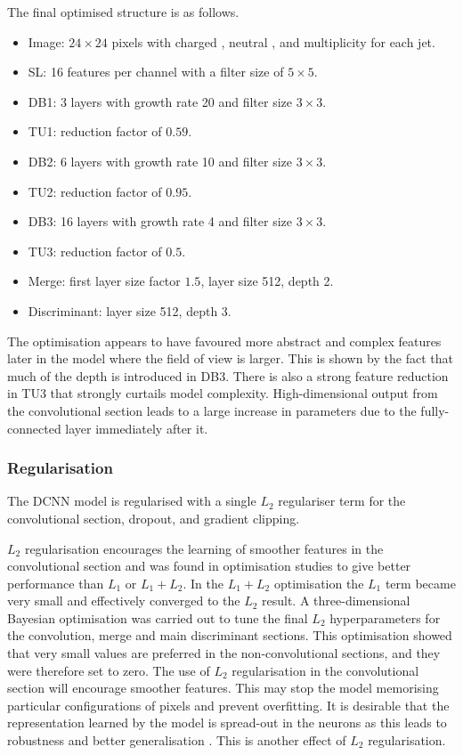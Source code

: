 The final optimised structure is as follows.
\begin{itemize}[noitemsep]
    \item Image: $24\times{24}$ pixels with charged \pt, neutral \pt, and multiplicity for each jet.
    \item SL: 16 features per channel with a filter size of $5\times{}5$.
    \item DB1: 3 layers with growth rate 20 and filter size $3\times{}3$.
    \item TU1: reduction factor of $0.59$.
    \item DB2: 6 layers with growth rate 10 and filter size $3\times{}3$.
    \item TU2: reduction factor of $0.95$.
    \item DB3: 16 layers with growth rate 4 and filter size $3\times{}3$.
    \item TU3: reduction factor of $0.5$.
    \item Merge: first layer size factor $1.5$, layer size 512, depth 2.
    \item Discriminant: layer size 512, depth 3.
\end{itemize}
The optimisation appears to have favoured more abstract and complex features later in the model where the field of view is larger. This is shown by the fact that much of the depth is introduced in DB3. 
There is also a strong feature reduction in TU3 that strongly curtails model complexity. High-dimensional output from the convolutional section leads to a large increase in parameters due to the fully-connected layer immediately after it. 




\subsubsection{Regularisation}
The DCNN model is regularised with a single $L_2$ regulariser term for the convolutional section, dropout, and gradient clipping.

$L_2$ regularisation encourages the learning of smoother features in the convolutional section and was found in optimisation studies to give better performance than $L_1$ or $L_1 + L_2$. 
In the $L_1 + L_2$ optimisation the $L_1$ term became very small and effectively converged to the $L_2$ result.
A three-dimensional Bayesian optimisation was carried out to tune the final $L_2$ hyperparameters for the convolution, merge and main discriminant sections.
This optimisation showed that very small values are preferred in the non-convolutional sections, and they were therefore set to zero. 
The use of $L_2$ regularisation in the convolutional section will encourage smoother features. This may stop the model memorising particular configurations of pixels and prevent overfitting. 
It is desirable that the representation learned by the model is spread-out in the neurons as this leads to robustness and better generalisation \cite{DeepMindDeletion}.
This is another effect of $L_2$ regularisation.

